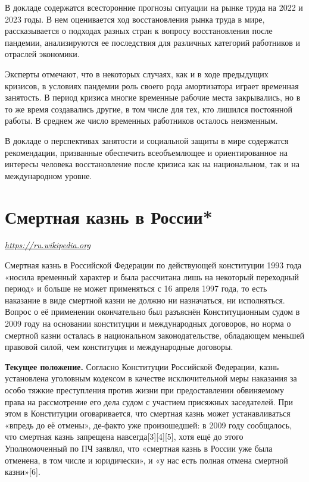 В докладе содержатся всесторонние прогнозы ситуации на рынке труда на 2022 и 2023 годы. В нем оценивается ход восстановления рынка труда в мире, рассказывается о подходах разных стран к вопросу восстановления после пандемии, анализируются ее последствия для различных категорий работников и отраслей экономики.

Эксперты отмечают, что в некоторых случаях, как и в ходе предыдущих кризисов, в условиях пандемии роль своего рода амортизатора играет временная занятость. В период кризиса многие временные рабочие места закрывались, но в то же время создавались другие, в том числе для тех, кто лишился постоянной работы. В среднем же число временных работников осталось неизменным.

В докладе о перспективах занятости и социальной защиты в мире содержатся рекомендации, призванные обеспечить всеобъемлющее и ориентированное на интересы человека восстановление после кризиса как на национальном, так и на международном уровне.


\clearpage


\section{Смертная казнь в России*}

 {\it \url{https://ru.wikipedia.org}}

Смертная казнь в Российской Федерации по действующей конституции 1993 года «носила временный характер и была рассчитана лишь на некоторый переходный период» и больше не может применяться с 16 апреля 1997 года, то есть наказание в виде смертной казни не должно ни назначаться, ни исполняться. Вопрос о её применении окончательно был разъяснён Конституционным судом в 2009 году на основании конституции и международных договоров, но норма о смертной казни осталась в национальном законодательстве, обладающем меньшей правовой силой, чем конституция и международные договоры.

\textbf{Текущее положение.} Согласно Конституции Российской Федерации, казнь установлена уголовным кодексом в качестве исключительной меры наказания за особо тяжкие преступления против жизни при предоставлении обвиняемому права на рассмотрение его дела судом с участием присяжных заседателей. При этом в Конституции оговаривается, что смертная казнь может устанавливаться «впредь до её отмены», де-факто уже произошедшей: в 2009 году сообщалось, что смертная казнь запрещена навсегда[3][4][5], хотя ещё до этого Уполномоченный по ПЧ заявлял, что «смертная казнь в России уже была отменена, в том числе и юридически», и «у нас есть полная отмена смертной казни»[6].


